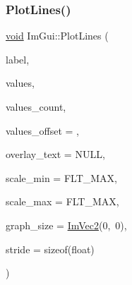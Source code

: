 \subsubsection{\texorpdfstring{Plot\+Lines()}{PlotLines()}\hspace{0.1cm}{\footnotesize\ttfamily [1/2]}}
{\footnotesize\ttfamily \hyperlink{imgui__impl__opengl3__loader_8h_ac668e7cffd9e2e9cfee428b9b2f34fa7}{void} Im\+Gui\+::\+Plot\+Lines (\begin{DoxyParamCaption}\item[{const char $\ast$}]{label,  }\item[{const float $\ast$}]{values,  }\item[{int}]{values\+\_\+count,  }\item[{int}]{values\+\_\+offset = {},  }\item[{const char $\ast$}]{overlay\+\_\+text = {\ttfamily NULL},  }\item[{float}]{scale\+\_\+min = {\ttfamily FLT\+\_\+MAX},  }\item[{float}]{scale\+\_\+max = {\ttfamily FLT\+\_\+MAX},  }\item[{\hyperlink{structImVec2}{Im\+Vec2}}]{graph\+\_\+size = {\ttfamily \hyperlink{structImVec2}{Im\+Vec2}(0,~0)},  }\item[{int}]{stride = {\ttfamily sizeof(float)} }\end{DoxyParamCaption})}

\mbox{\label{namespaceImGui_a94a2645d45c96da35b834dc7db93a9f1}} 
